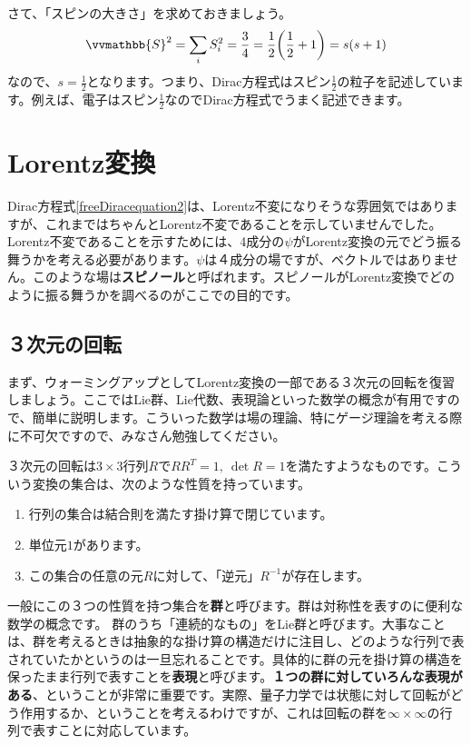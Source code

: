 \documentclass[report,paper=a4, fontsize=12pt, line_length=16cm, number_of_lines=33,dvipdfmx]{jlreq}
\numberwithin{equation}{chapter}
\newcommand{\strong}[1]{{\sffamily \bfseries #1}}
\newcommand{\Sb}{\vvmathbb{S}}
\begin{document}
さて、「スピンの大きさ」を求めておきましょう。
\begin{align}
  \Sb^2=\sum_{i}S_i^2=\frac{3}{4}=\frac{1}{2}\qty(\frac{1}{2}+1)=s(s+1)
\end{align}
なので、$s=\frac{1}{2}$となります。つまり、Dirac方程式はスピン$\frac{1}{2}$の粒子を記述しています。例えば、電子はスピン$\frac{1}{2}$なのでDirac方程式でうまく記述できます。

\section{Lorentz変換}
Dirac方程式\eqref{freeDiracequation2}は、Lorentz不変になりそうな雰囲気ではありますが、これまではちゃんとLorentz不変であることを示していませんでした。Lorentz不変であることを示すためには、4成分の$\psi$がLorentz変換の元でどう振る舞うかを考える必要があります。$\psi$は４成分の場ですが、ベクトルではありません。このような場は\strong{スピノール}と呼ばれます。スピノールがLorentz変換でどのように振る舞うかを調べるのがここでの目的です。

\subsection{３次元の回転}
まず、ウォーミングアップとしてLorentz変換の一部である３次元の回転を復習しましょう。ここではLie群、Lie代数、表現論といった数学の概念が有用ですので、簡単に説明します。こういった数学は場の理論、特にゲージ理論を考える際に不可欠ですので、みなさん勉強してください。

３次元の回転は$3\times 3$行列$R$で$RR^{T}=1,\ \det R=1$を満たすようなものです。こういう変換の集合は、次のような性質を持っています。
\begin{enumerate}
  \item 行列の集合は結合則を満たす掛け算で閉じています。
  \item 単位元$1$があります。
  \item この集合の任意の元$R$に対して、「逆元」$R^{-1}$が存在します。
\end{enumerate}
一般にこの３つの性質を持つ集合を\strong{群}と呼びます。群は対称性を表すのに便利な数学の概念です。
群のうち「連続的なもの」をLie群と呼びます。大事なことは、群を考えるときは抽象的な掛け算の構造だけに注目し、どのような行列で表されていたかというのは一旦忘れることです。具体的に群の元を掛け算の構造を保ったまま行列で表すことを\strong{表現}と呼びます。\strong{１つの群に対していろんな表現がある}、ということが非常に重要です。実際、量子力学では状態に対して回転がどう作用するか、ということを考えるわけですが、これは回転の群を$\infty\times\infty$の行列で表すことに対応しています。
\end{document}
